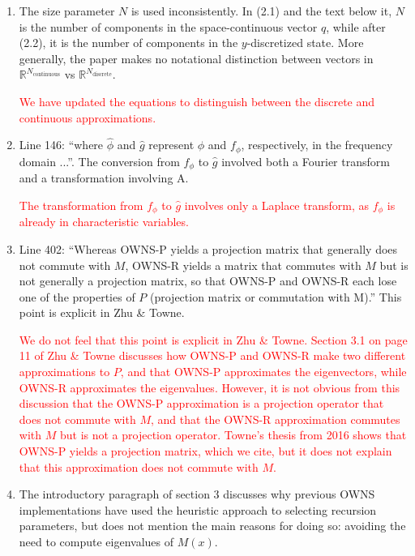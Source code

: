 \documentclass{article}
\newcommand{\response}[1]{\textcolor{red}{#1}}
\begin{document}
\begin{enumerate}
    \item The size parameter $N$ is used inconsistently. In (2.1) and the text below it, $N$ is the number of components in the space-continuous vector $q$, while after (2.2), it is the number of components in the $y$-discretized state. More generally, the paper makes no notational distinction between vectors in $\mathbb{R}^{N_{\text{continuous}}}$ vs $\mathbb{R}^{N_{\text{discrete}}}$.
    
    \response{
    We have updated the equations to distinguish between the discrete and continuous approximations.
    }
    \item Line 146: ``where $\hat{\phi}$ and $\hat{g}$ represent $\phi$ and $f_{\phi}$, respectively, in the frequency domain ...''. The conversion from $f_{\phi}$ to $\hat{g}$ involved both a Fourier transform and a transformation involving A.
    
    \response{
    The transformation from $f_\phi$ to $\hat{g}$ involves only a Laplace transform, as $f_\phi$ is already in characteristic variables.
    }
    \item Line 402: ``Whereas OWNS-P yields a projection matrix that generally does not commute with $M$, OWNS-R yields a matrix that commutes with $M$ but is not generally a projection matrix, so that OWNS-P and OWNS-R each lose one of the properties of $P$ (projection matrix or commutation with M).'' This point is explicit in Zhu \& Towne.
    
    \response{We do not feel that this point is explicit in Zhu \& Towne. Section 3.1 on page 11 of Zhu \& Towne discusses how OWNS-P and OWNS-R make two different approximations to $P$, and that OWNS-P approximates the eigenvectors, while OWNS-R approximates the eigenvalues. However, it is not obvious from this discussion that the OWNS-P approximation is a projection operator that does not commute with $M$, and that the OWNS-R approximation commutes with $M$ but is not a projection operator. Towne's thesis from 2016 shows that OWNS-P yields a projection matrix, which we cite, but it does not explain that this approximation does not commute with $M$.}
    
    \item The introductory paragraph of section 3 discusses why previous OWNS implementations have used the heuristic approach to selecting recursion parameters, but does not mention the main reasons for doing so: avoiding the need to compute eigenvalues of $M(x)$.


\end{enumerate}
\end{document}
